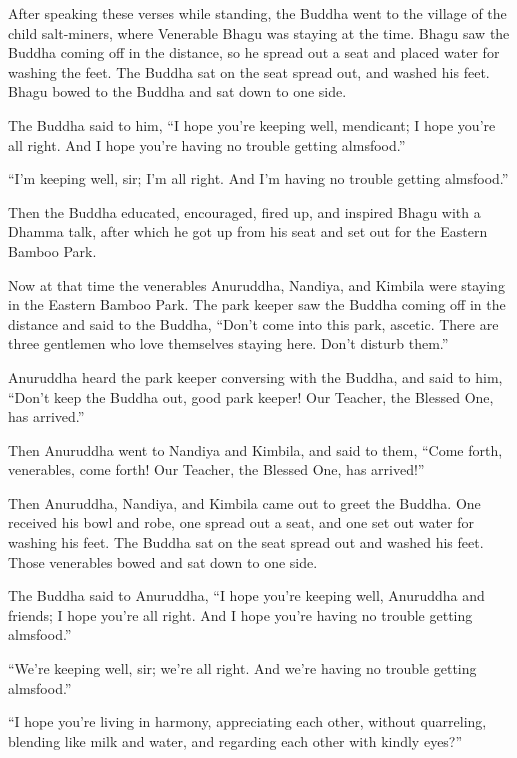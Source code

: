 \documentclass[12pt,openany]{book}%
\begin{document}
After speaking these verses while standing, the Buddha went to the village of the child salt-miners, where Venerable Bhagu was staying at the time. Bhagu saw the Buddha coming off in the distance, so he spread out a seat and placed water for washing the feet. The Buddha sat on the seat spread out, and washed his feet. Bhagu bowed to the Buddha and sat down to one side. 

The Buddha said to him, “I hope you’re keeping well, mendicant; I hope you’re all right. And I hope you’re having no trouble getting almsfood.” 

“I’m keeping well, sir; I’m all right. And I’m having no trouble getting almsfood.” 

Then the Buddha educated, encouraged, fired up, and inspired Bhagu with a Dhamma talk, after which he got up from his seat and set out for the Eastern Bamboo Park. 

Now at that time the venerables Anuruddha, Nandiya, and Kimbila were staying in the Eastern Bamboo Park. The park keeper saw the Buddha coming off in the distance and said to the Buddha, “Don’t come into this park, ascetic. There are three gentlemen who love themselves staying here. Don’t disturb them.” 

Anuruddha heard the park keeper conversing with the Buddha, and said to him, “Don’t keep the Buddha out, good park keeper! Our Teacher, the Blessed One, has arrived.” 

Then Anuruddha went to Nandiya and Kimbila, and said to them, “Come forth, venerables, come forth! Our Teacher, the Blessed One, has arrived!” 

Then Anuruddha, Nandiya, and Kimbila came out to greet the Buddha. One received his bowl and robe, one spread out a seat, and one set out water for washing his feet. The Buddha sat on the seat spread out and washed his feet. Those venerables bowed and sat down to one side. 

The Buddha said to Anuruddha, “I hope you’re keeping well, Anuruddha and friends; I hope you’re all right. And I hope you’re having no trouble getting almsfood.” 

“We’re keeping well, sir; we’re all right. And we’re having no trouble getting almsfood.” 

“I hope you’re living in harmony, appreciating each other, without quarreling, blending like milk and water, and regarding each other with kindly eyes?” 
\end{document}
